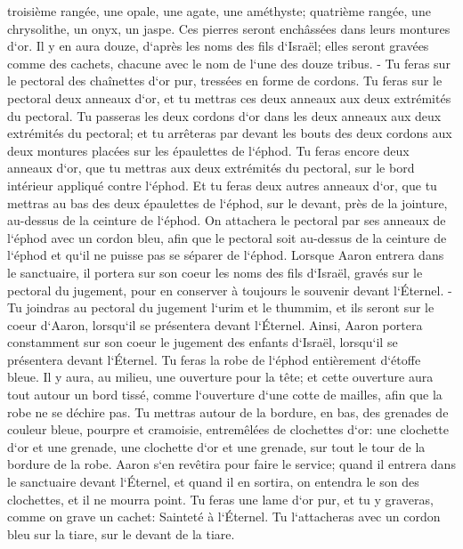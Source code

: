 \verse troisième rangée, une opale, une agate, une améthyste; 
\verse quatrième rangée, une chrysolithe, un onyx, un jaspe. Ces pierres seront enchâssées dans leurs montures d`or. 
\verse Il y en aura douze, d`après les noms des fils d`Israël; elles seront gravées comme des cachets, chacune avec le nom de l`une des douze tribus. - 
\verse Tu feras sur le pectoral des chaînettes d`or pur, tressées en forme de cordons. 
\verse Tu feras sur le pectoral deux anneaux d`or, et tu mettras ces deux anneaux aux deux extrémités du pectoral. 
\verse Tu passeras les deux cordons d`or dans les deux anneaux aux deux extrémités du pectoral; 
\verse et tu arrêteras par devant les bouts des deux cordons aux deux montures placées sur les épaulettes de l`éphod. 
\verse Tu feras encore deux anneaux d`or, que tu mettras aux deux extrémités du pectoral, sur le bord intérieur appliqué contre l`éphod. 
\verse Et tu feras deux autres anneaux d`or, que tu mettras au bas des deux épaulettes de l`éphod, sur le devant, près de la jointure, au-dessus de la ceinture de l`éphod. 
\verse On attachera le pectoral par ses anneaux de l`éphod avec un cordon bleu, afin que le pectoral soit au-dessus de la ceinture de l`éphod et qu`il ne puisse pas se séparer de l`éphod. 
\verse Lorsque Aaron entrera dans le sanctuaire, il portera sur son coeur les noms des fils d`Israël, gravés sur le pectoral du jugement, pour en conserver à toujours le souvenir devant l`Éternel. - 
\verse Tu joindras au pectoral du jugement l`urim et le thummim, et ils seront sur le coeur d`Aaron, lorsqu`il se présentera devant l`Éternel. Ainsi, Aaron portera constamment sur son coeur le jugement des enfants d`Israël, lorsqu`il se présentera devant l`Éternel. 
\verse Tu feras la robe de l`éphod entièrement d`étoffe bleue. 
\verse Il y aura, au milieu, une ouverture pour la tête; et cette ouverture aura tout autour un bord tissé, comme l`ouverture d`une cotte de mailles, afin que la robe ne se déchire pas. 
\verse Tu mettras autour de la bordure, en bas, des grenades de couleur bleue, pourpre et cramoisie, entremêlées de clochettes d`or: 
\verse une clochette d`or et une grenade, une clochette d`or et une grenade, sur tout le tour de la bordure de la robe. 
\verse Aaron s`en revêtira pour faire le service; quand il entrera dans le sanctuaire devant l`Éternel, et quand il en sortira, on entendra le son des clochettes, et il ne mourra point. 
\verse Tu feras une lame d`or pur, et tu y graveras, comme on grave un cachet: Sainteté à l`Éternel. 
\verse Tu l`attacheras avec un cordon bleu sur la tiare, sur le devant de la tiare. 
